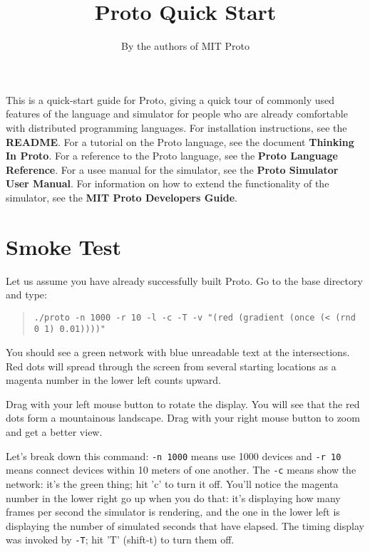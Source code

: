 \documentclass{article}
\title{Proto Quick Start}
\author{By the authors of MIT Proto}
\date{\releasetag}
\newcommand\code[1]{\begin{quote}\var{#1}\end{quote}}
\newcommand\var[1]{{\tt #1}}
\begin{document}
\maketitle

This is a quick-start guide for Proto, giving a quick tour of commonly
used features of the language and simulator for people who are already
comfortable with distributed programming languages.  For installation
instructions, see the {\bf README}.  For a tutorial on the Proto
language, see the document {\bf Thinking In Proto}.  For a reference
to the Proto language, see the {\bf Proto Language Reference}.  For a
usee manual for the simulator, see the {\bf Proto Simulator User
  Manual}.  For information on how to extend the functionality of the
simulator, see the {\bf MIT Proto Developers Guide}.

\credits{}

\section{Smoke Test}

Let us assume you have already successfully built Proto.
Go to the base directory and type:
\code{./proto -n 1000 -r 10 -l -c -T -v "(red (gradient (once (< (rnd
  0 1) 0.01))))"}
You should see a green network with blue unreadable text at the
intersections.  Red dots will spread through the screen from
several starting locations as a magenta number in the lower
left counts upward.

Drag with your left mouse button to rotate the display.  You will see
that the red dots form a mountainous landscape.  Drag with your right
mouse button to zoom and get a better view.

Let's break down this command: \var{-n 1000} means use 1000 devices
and \var{-r 10} means connect devices within 10 meters of one another.
The \var{-c} means show the network: it's the green thing; hit 'c' to
turn it off.  You'll notice the magenta number in the lower right go
up when you do that: it's displaying how many frames per second the
simulator is rendering, and the one in the lower left is displaying
the number of simulated seconds that have elapsed.  The timing display
was invoked by \var{-T}; hit 'T' (shift-t) to turn them off.
\end{document}
